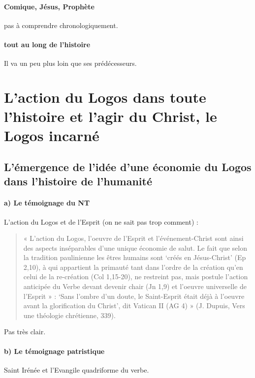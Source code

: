 \paragraph{Comique, Jésus, Prophète} pas à comprendre chronologiquement.
\paragraph{tout au long de l'histoire} Il va un peu plus loin que ses prédécesseurs.

\section{L’action du Logos dans toute l’histoire et l’agir du Christ, le Logos incarné}
 
\subsection{L’émergence de l’idée d’une économie du Logos dans l’histoire de l’humanité}



\paragraph{a) Le témoignage du NT}
L'action du Logos et de l'Esprit (on ne sait pas trop comment) : 
\begin{quote}
    « L’action du Logos, l’oeuvre de l’Esprit et l’événement-Christ sont ainsi des aspects inséparables
d’une unique économie de salut. Le fait que selon la tradition paulinienne les êtres humains sont ‘créés
en Jésus-Christ’ (Ep 2,10), à qui appartient la primauté tant dans l’ordre de la création qu’en celui de
la re-création (Col 1,15-20), ne restreint pas, mais postule l’action anticipée du Verbe devant devenir
chair (Jn 1,9) et l’oeuvre universelle de l’Esprit » : ‘Sans l’ombre d’un doute, le Saint-Esprit était déjà
à l’oeuvre avant la glorification du Christ’, dit Vatican II (AG 4) » (J. Dupuis, Vers une théologie
chrétienne, 339).
\end{quote}

Pas très clair.

\paragraph{b) Le témoignage patristique} Saint Irénée et l'Evangile quadriforme du verbe. 

